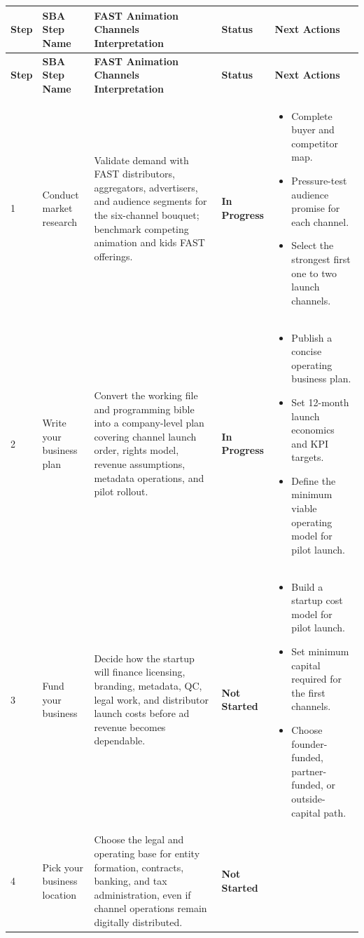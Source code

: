 \documentclass[10pt]{article}
\newcommand{\statusbox}[1]{\textbf{#1}}
\newcommand{\tightlist}[1]{\begin{itemize}#1\end{itemize}}
\begin{document}
\begin{longtable}{@{}L{0.05\textwidth}L{0.16\textwidth}L{0.28\textwidth}L{0.10\textwidth}L{0.25\textwidth}@{}}
\color{white}\textbf{Step} & \color{white}\textbf{SBA Step Name} & \color{white}\textbf{FAST Animation Channels Interpretation} & \color{white}\textbf{Status} & \color{white}\textbf{Next Actions} \\
\endfirsthead
{}
\color{white}\textbf{Step} & \color{white}\textbf{SBA Step Name} & \color{white}\textbf{FAST Animation Channels Interpretation} & \color{white}\textbf{Status} & \color{white}\textbf{Next Actions} \\
\endhead
{}
1 & Conduct market research & Validate demand with FAST distributors, aggregators, advertisers, and audience segments for the six-channel bouquet; benchmark competing animation and kids FAST offerings. & \statusbox{In Progress} & \tightlist{
\item Complete buyer and competitor map.
\item Pressure-test audience promise for each channel.
\item Select the strongest first one to two launch channels.
} \\
2 & Write your business plan & Convert the working file and programming bible into a company-level plan covering channel launch order, rights model, revenue assumptions, metadata operations, and pilot rollout. & \statusbox{In Progress} & \tightlist{
\item Publish a concise operating business plan.
\item Set 12-month launch economics and KPI targets.
\item Define the minimum viable operating model for pilot launch.
} \\
3 & Fund your business & Decide how the startup will finance licensing, branding, metadata, QC, legal work, and distributor launch costs before ad revenue becomes dependable. & \statusbox{Not Started} & \tightlist{
\item Build a startup cost model for pilot launch.
\item Set minimum capital required for the first channels.
\item Choose founder-funded, partner-funded, or outside-capital path.
} \\
4 & Pick your business location & Choose the legal and operating base for entity formation, contracts, banking, and tax administration, even if channel operations remain digitally distributed. & \statusbox{Not Started} & \tightlist{
}
\end{longtable}
\end{document}
